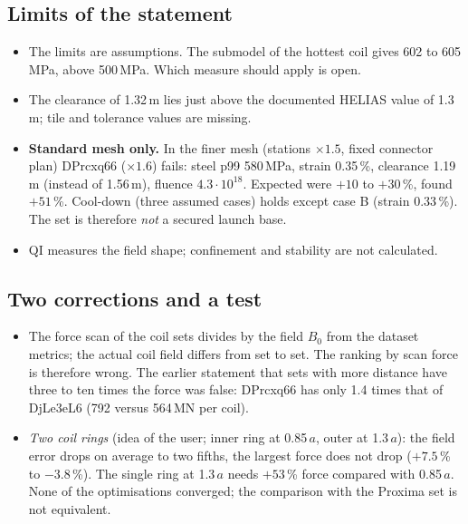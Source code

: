 \subsection*{Limits of the statement}
\begin{itemize}\itemsep1pt
\item The limits are assumptions. The submodel of the hottest coil gives 602 to 605\,MPa, above 500\,MPa. Which measure should apply is open.
\item The clearance of 1.32\,m lies just above the documented HELIAS value of 1.3\,m; tile and tolerance values are missing.
\item \textbf{Standard mesh only.} In the finer mesh (stations $\times1.5$, fixed connector plan) DPrcxq66 ($\times1.6$) fails: steel p99 580\,MPa, strain 0.35\,\%, clearance 1.19\,m (instead of 1.56\,m), fluence $4.3\cdot10^{18}$. Expected were $+10$ to $+30$\,\%, found $+51$\,\%. Cool-down (three assumed cases) holds except case B (strain 0.33\,\%). The set is therefore \emph{not} a secured launch base.
\item QI measures the field shape; confinement and stability are not calculated.
\end{itemize}

\subsection*{Two corrections and a test}
\begin{itemize}\itemsep1pt
\item The force scan of the coil sets divides by the field $B_0$ from the dataset metrics; the actual coil field differs from set to set. The ranking by scan force is therefore wrong. The earlier statement that sets with more distance have three to ten times the force was false: DPrcxq66 has only 1.4 times that of DjLe3eL6 (792 versus 564\,MN per coil).
\item \emph{Two coil rings} (idea of the user; inner ring at 0.85\,$a$, outer at 1.3\,$a$): the field error drops on average to two fifths, the largest force does not drop ($+7.5$\,\% to $-3.8$\,\%). The single ring at 1.3\,$a$ needs $+53$\,\% force compared with 0.85\,$a$. None of the optimisations converged; the comparison with the Proxima set is not equivalent.
\end{itemize}
